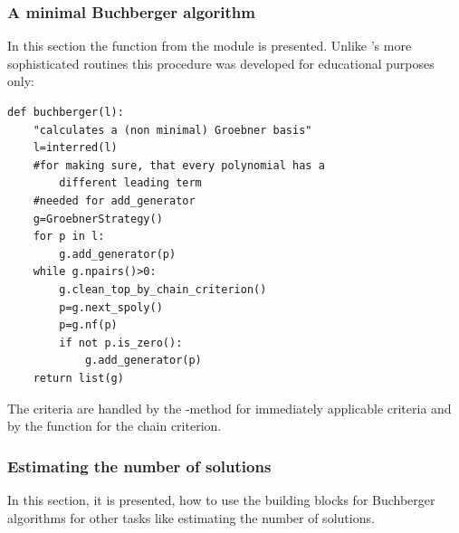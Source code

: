\subsubsection{A minimal Buchberger algorithm}
In this section   the  function from the module
 is presented. Unlike \PolyBoRi's more sophisticated
routines this procedure was developed for educational purposes only:
\begin{lstlisting}
def buchberger(l):
    "calculates a (non minimal) Groebner basis"
    l=interred(l)
    #for making sure, that every polynomial has a 
        different leading term
    #needed for add_generator
    g=GroebnerStrategy()
    for p in l:
        g.add_generator(p)
    while g.npairs()>0:
        g.clean_top_by_chain_criterion()
        p=g.next_spoly()
        p=g.nf(p)
        if not p.is_zero():
            g.add_generator(p)
    return list(g)
\end{lstlisting}
The criteria are handled by the -method for
immediately applicable criteria and by the function  for the chain criterion.


\subsubsection{Estimating the number of solutions}
In this section, it is presented, how to use the building blocks for Buchberger algorithms for other tasks like estimating the number of solutions.

